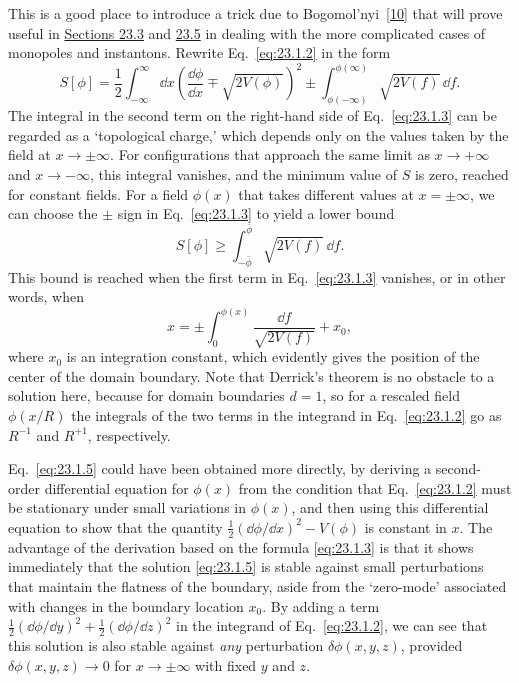 This is a good place to introduce a trick due to
Bogomol'nyi~\hyperref[ch23-ref-10]{[10]} that will prove useful in
\hyperref[sec:23.3]{Sections 23.3} and \hyperref[sec:23.5]{23.5} in dealing
with the more complicated cases of monopoles and instantons. Rewrite
Eq.~\eqref{eq:23.1.2} in the form
\begin{equation}
 S[\phi]=\frac{1}{2}\int_{-\infty}^{\infty}\dd x
 \left(\frac{\dd\phi}{\dd x}\mp\sqrt{2V(\phi)}\right)^2
 \mathbin{\pm}\int_{\phi(-\infty)}^{\phi(\infty)}
 \sqrt{2V(f)}\,\dd f.
 \tag{23.1.3}\label{eq:23.1.3}
\end{equation}
The integral in the second term on the right-hand side of
Eq.~\eqref{eq:23.1.3} can be regarded as a `topological charge,' which
depends only on the values taken by the field at $x\to\pm\infty$. For
configurations that approach the same limit as $x\to+\infty$ and
$x\to-\infty$, this integral vanishes, and the minimum value of $S$ is zero,
reached for constant fields. For a field $\phi(x)$ that takes different
values at $x=\pm\infty$, we can choose the $\pm$ sign in
Eq.~\eqref{eq:23.1.3} to yield a lower bound
\begin{equation}
 S[\phi]\geq\int_{-\bar\phi}^{\bar\phi}\sqrt{2V(f)}\,\dd f.
 \tag{23.1.4}\label{eq:23.1.4}
\end{equation}
This bound is reached when the first term in Eq.~\eqref{eq:23.1.3}
vanishes, or in other words, when
\begin{equation}
 x=\mathbin{\pm}\int_0^{\phi(x)}
 \frac{\dd f}{\sqrt{2V(f)}}+x_0,
 \tag{23.1.5}\label{eq:23.1.5}
\end{equation}
where $x_0$ is an integration constant, which evidently gives the position
of the center of the domain boundary. Note that Derrick's theorem is no
obstacle to a solution here, because for domain boundaries $d=1$, so for a
rescaled field $\phi(x/R)$ the integrals of the two terms in the integrand
in Eq.~\eqref{eq:23.1.2} go as $R^{-1}$ and $R^{+1}$, respectively.

Eq.~\eqref{eq:23.1.5} could have been obtained more directly, by deriving a
second-order differential equation for $\phi(x)$ from the condition that
Eq.~\eqref{eq:23.1.2} must be stationary under small variations in
$\phi(x)$, and then using this differential equation to show that the
quantity $\frac{1}{2}(\dd\phi/\dd x)^2-V(\phi)$ is constant in $x$. The advantage
of the derivation based on the formula \eqref{eq:23.1.3} is that it shows
immediately that the solution \eqref{eq:23.1.5} is stable against small
perturbations that maintain the flatness of the boundary, aside from the
`zero-mode' associated with changes in the boundary location $x_0$. By
adding a term
$\frac{1}{2}(\dd\phi/\dd y)^2+\frac{1}{2}(\dd\phi/\dd z)^2$ in the integrand of
Eq.~\eqref{eq:23.1.2}, we can see that this solution is also stable against
\emph{any} perturbation $\delta\phi(x,y,z)$, provided
$\delta\phi(x,y,z)\to0$ for $x\to\pm\infty$ with fixed $y$ and $z$.

